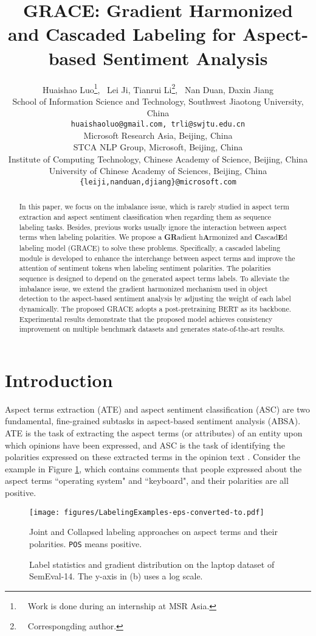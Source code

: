 \documentclass[11pt,a4paper]{article}
\title{GRACE: Gradient Harmonized and Cascaded Labeling for Aspect-based Sentiment Analysis}
\author{Huaishao Luo\thanks{~~Work is done during an internship at MSR Asia.}, ~Lei Ji, Tianrui Li\thanks{~~Correspongding author.}, ~Nan Duan, Daxin Jiang\\
    School of Information Science and Technology, Southwest Jiaotong University, China\\
    {\tt huaishaoluo@gmail.com, trli@swjtu.edu.cn}\\
	Microsoft Research Asia, Beijing, China\\
	STCA NLP Group, Microsoft, Beijing, China \\
	Institute of Computing Technology, Chinese Academy of Science, Beijing, China\\
	University of Chinese Academy of Sciences, Beijing, China \\
	{\tt \{leiji,nanduan,djiang\}@microsoft.com}
}
\date{}
\begin{document}
\maketitle
\begin{abstract}
In this paper, we focus on the imbalance issue, which is rarely studied in aspect term extraction and aspect sentiment classification when regarding them as sequence labeling tasks. Besides, previous works usually ignore the interaction between aspect terms when labeling polarities. We propose a \textbf{GR}adient h\textbf{A}rmonized and \textbf{C}ascad\textbf{E}d labeling model (GRACE) to solve these problems. Specifically, a cascaded labeling module is developed to enhance the interchange between aspect terms and improve the attention of sentiment tokens when labeling sentiment polarities. The polarities sequence is designed to depend on the generated aspect terms labels. To alleviate the imbalance issue, we extend the gradient harmonized mechanism used in object detection to the aspect-based sentiment analysis by adjusting the weight of each label dynamically. The proposed GRACE adopts a post-pretraining BERT as its backbone. Experimental results demonstrate that the proposed model achieves consistency improvement on multiple benchmark datasets and generates state-of-the-art results.
\end{abstract}

\section{Introduction}
\label{sec_introduction}
Aspect terms extraction (ATE) and aspect sentiment classification (ASC) are two fundamental, fine-grained subtasks in aspect-based sentiment analysis (ABSA). ATE is the task of extracting the aspect terms (or attributes) of an entity upon which opinions have been expressed, and ASC is the task of identifying the polarities expressed on these extracted terms in the opinion text \cite{Hu2004}. Consider the example in Figure \ref{table_labeling_examples}, which contains comments that people expressed about the aspect terms ``operating system" and ``keyboard", and their polarities are all positive.
\begin{figure}[htb]
	\centering
	\texttt{[image: figures/LabelingExamples-eps-converted-to.pdf]}
    \caption{Joint and Collapsed labeling approaches on aspect terms and their polarities. \texttt{POS} means positive.}
    \label{table_labeling_examples}
\end{figure}
\begin{figure}[htb]
    \centering
    \caption{Label statistics and gradient distribution on the laptop dataset of SemEval-14. The y-axis in (b) uses a log scale.}  
    \label{fig_statistic}
\end{figure}
\end{document}
